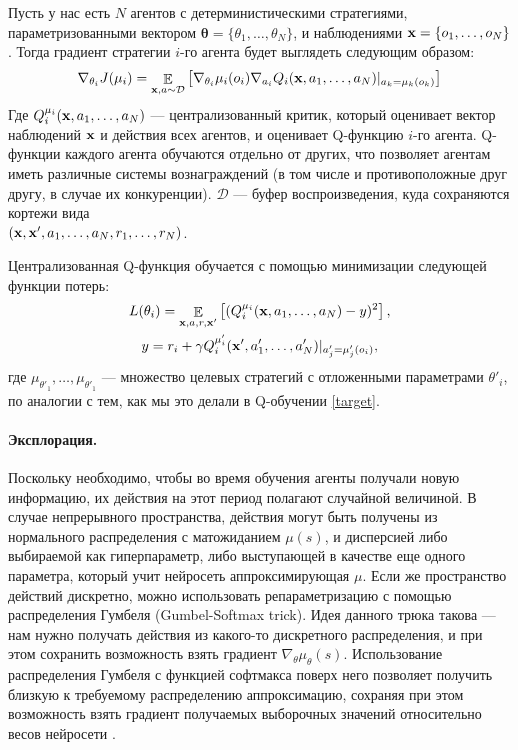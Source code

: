 \documentclass[12pt, a4paper]{extarticle}
\newcommand{\E}{\mathop{\mathbb{E}}}
\theoremstyle{definition}
\begin{document}
Пусть у нас есть $N$ агентов с детерминистическими стратегиями, параметризованными вектором $\pmb{\theta}=\{\theta_1,\ldots,\theta_N\}$, и наблюдениями $\bold{x}=\{o_1,\ldots,o_N\}$. Тогда градиент стратегии $i$-го агента будет выглядеть следующим образом:
\begin{equation}
    \nabla_{\theta_i}J(\mu_i)= \E_{\bold{x},a \sim \mathcal{D}} \left[\nabla_{\theta_i}\mu_i(o_i) \nabla_{a_i}Q_i(\bold{x},a_1,\ldots,a_N)\rvert_{a_k=\mu_k(o_k)} \right]
\end{equation}
Где $Q^{\mu_i}_i(\bold{x},a_1,\ldots,a_N)$ --- централизованный критик, который оценивает вектор наблюдений $\bold{x}$ и действия всех агентов, и оценивает Q-функцию $i$-го агента. Q-функции каждого агента обучаются отдельно от других, что позволяет агентам иметь различные системы вознаграждений (в том числе и противоположные друг другу, в случае их конкуренции). $\mathcal{D}$ --- буфер воспроизведения, куда сохраняются кортежи вида \\ $(\bold{x}, \bold{x}', a_1, \ldots, a_N,r_1, \ldots, r_N)$.

Централизованная Q-функция обучается с помощью минимизации следующей функции потерь:
\begin{equation}
\begin{gathered}
       L(\theta_i) = \E_{\bold{x},a,r,\bold{x}'} \left[ (Q_i^{\mu_i}(\bold{x},a_1, \ldots, a_N) - y)^2  \right],\\ y= r_i + \gamma Q_i^{\mu'_i}(\bold{x}',a'_1, \ldots, a'_N)\rvert_{a'_j=\mu'_j(o_i)},
\end{gathered}
\end{equation}
где ${\mu_{\theta'_1},\ldots,\mu_{\theta'_1}}$ --- множество целевых стратегий с отложенными параметрами $\theta'_i$, по аналогии с тем, как мы это делали в Q-обучении \ref{target}.

\paragraph{Эксплорация.} Поскольку необходимо, чтобы во время обучения агенты получали новую информацию, их действия на этот период полагают случайной величиной. В случае непрерывного пространства, действия могут быть получены из нормального распределения с матожиданием $\mu(s)$, и дисперсией либо выбираемой как гиперпараметр, либо выступающей в качестве еще одного параметра, который учит нейросеть аппроксимирующая $\mu$. Если же пространство действий дискретно, можно использовать репараметризацию с помощью распределения Гумбеля (Gumbel-Softmax trick). Идея данного трюка такова --- нам нужно получать действия из какого-то дискретного распределения, и при этом сохранить возможность взять градиент $\nabla_{\theta}\mu_{\theta}(s)$. Использование распределения Гумбеля с функцией софтмакса поверх него позволяет получить близкую к требуемому распределению аппроксимацию, сохраняя при этом возможность взять градиент получаемых выборочных значений относительно весов нейросети \cite{jang2016categorical}.
\end{document}
